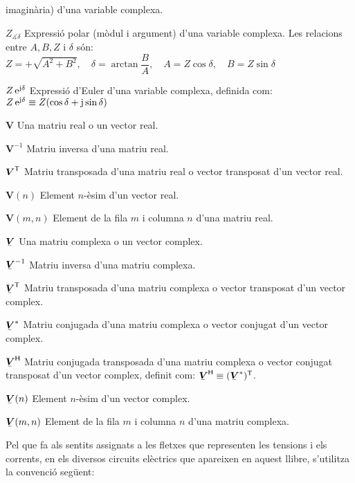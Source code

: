 \begin{list}{}
    imagin\`{a}ria) d'una variable complexa.
    \item[$Z_{\measuredangle \delta}$] Expressi\'{o} polar (m\`{o}dul i argument) d'una variable
    complexa. Les relacions entre $A, B, Z$ i $\delta$ s\'{o}n:\\[1ex]
    $Z=+\sqrt{A^2+B^2},\quad\delta=\arctan{\dfrac{B}{A}},\quad
    A=Z\cos\delta,\quad B=Z\sin\delta$
    \item[$Z\,\mathrm{e}^{\mathrm{j}\delta}$] Expressi\'{o} d'Euler d'una variable complexa, definida com:
     $Z\,\mathrm{e}^{\mathrm{j}\delta} \equiv Z(\cos\delta+\mathrm{j}\sin\delta)$
    \item[$\boldsymbol{V}$] Una matriu real o un vector real.
    \item[$\boldsymbol{V}^{-1}$] Matriu inversa d'una matriu real.
    \item[$\boldsymbol{V}^\mathrm{\textsf{T}}$] Matriu transposada d'una matriu real o vector
    transposat d'un vector real.
    \item[$\boldsymbol{V}(n)$] Element $n$-\`{e}sim d'un vector real.
    \item[$\boldsymbol{V}(m,n)$] Element de la fila $m$ i columna $n$ d'una matriu real.
    \item[$\mcmplx{V}$] Una matriu complexa o un vector complex.
    \item[$\mcmplx{V}^{-1}$] Matriu inversa d'una matriu complexa.
    \item[$\transp{\mcmplx{V}}$] Matriu transposada d'una matriu complexa o vector
    transposat d'un vector complex.
    \item[$\mcmplx{V}^*$] Matriu conjugada d'una matriu complexa o vector
    conjugat d'un vector complex.
    \item[$\hermit{V}$] Matriu conjugada transposada d'una matriu complexa o vector
    conjugat transposat d'un vector complex, definit com: $\hermit{V} \equiv
    \transp{(\mcmplx{V}^*)}$.
    \item[$\mcmplx{V}(n)$] Element $n$-\`{e}sim d'un vector complex.
    \item[$\mcmplx{V}(m,n)$] Element de la fila $m$ i columna $n$ d'una matriu complexa.
\end{list}

Pel que fa als sentits assignats a les fletxes que representen les
tensions i els corrents, en els diversos circuits el\`{e}ctrics que
apareixen en aquest llibre, s'utilitza la convenci\'{o} seg\"{u}ent:

